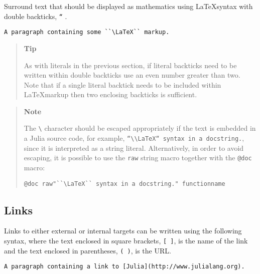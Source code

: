 Surround text that should be displayed as mathematics using  \LaTeX  syntax with double backticks, \texttt{``} .




\begin{lstlisting}
A paragraph containing some ``\LaTeX`` markup.
\end{lstlisting}



\begin{quote}
\textbf{Tip}

As with literals in the previous section, if literal backticks need to be written within double backticks use an even number greater than two. Note that if a single literal backtick needs to be included within  \LaTeX  markup then two enclosing backticks is sufficient.

\end{quote}


\begin{quote}
\textbf{Note}

The \texttt{{\textbackslash}} character should be escaped appropriately if the text is embedded in a Julia source code, for example, \texttt{{\textquotedbl}``{\textbackslash}{\textbackslash}LaTeX`` syntax in a docstring.{\textquotedbl}}, since it is interpreted as a string literal. Alternatively, in order to avoid escaping, it is possible to use the \texttt{raw} string macro together with the \texttt{@doc} macro:


\begin{lstlisting}
@doc raw"``\LaTeX`` syntax in a docstring." functionname
\end{lstlisting}

\end{quote}


\hypertarget{10395937766942848638}{}


\subsection{Links}



Links to either external or internal targets can be written using the following syntax, where the text enclosed in square brackets, \texttt{[ ]}, is the name of the link and the text enclosed in parentheses, \texttt{( )}, is the URL.




\begin{lstlisting}
A paragraph containing a link to [Julia](http://www.julialang.org).
\end{lstlisting}



